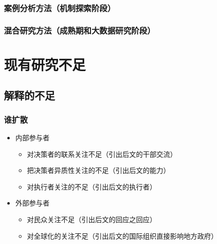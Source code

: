\documentclass[
  12pt,
]{ctexart}
\begin{document}
\hypertarget{ux6848ux4f8bux5206ux6790ux65b9ux6cd5ux673aux5236ux63a2ux7d22ux9636ux6bb5}{%
\subsubsection{案例分析方法（机制探索阶段）}\label{ux6848ux4f8bux5206ux6790ux65b9ux6cd5ux673aux5236ux63a2ux7d22ux9636ux6bb5}}

\hypertarget{ux6df7ux5408ux7814ux7a76ux65b9ux6cd5ux6210ux719fux671fux548cux5927ux6570ux636eux7814ux7a76ux9636ux6bb5}{%
\subsubsection{混合研究方法（成熟期和大数据研究阶段）}\label{ux6df7ux5408ux7814ux7a76ux65b9ux6cd5ux6210ux719fux671fux548cux5927ux6570ux636eux7814ux7a76ux9636ux6bb5}}

\hypertarget{ux73b0ux6709ux7814ux7a76ux4e0dux8db3}{%
\section{现有研究不足}\label{ux73b0ux6709ux7814ux7a76ux4e0dux8db3}}

\hypertarget{ux89e3ux91caux7684ux4e0dux8db3}{%
\subsection{解释的不足}\label{ux89e3ux91caux7684ux4e0dux8db3}}

\hypertarget{ux8c01ux6269ux6563}{%
\subsubsection{谁扩散}\label{ux8c01ux6269ux6563}}

\begin{itemize}
\item
  内部参与者

  \begin{itemize}
  \item
    对决策者的联系关注不足（引出后文的干部交流）
  \item
    把决策者异质性关注的不足（引出后文的能力）
  \item
    对执行者关注的不足（引出后文的执行者）
  \end{itemize}
\item
  外部参与者

  \begin{itemize}
  \item
    对民众关注不足（引出后文的回应之回应）
  \item
    对全球化的关注不足（引出后文的国际组织直接影响地方政府）
  \end{itemize}
\end{itemize}
\end{document}

